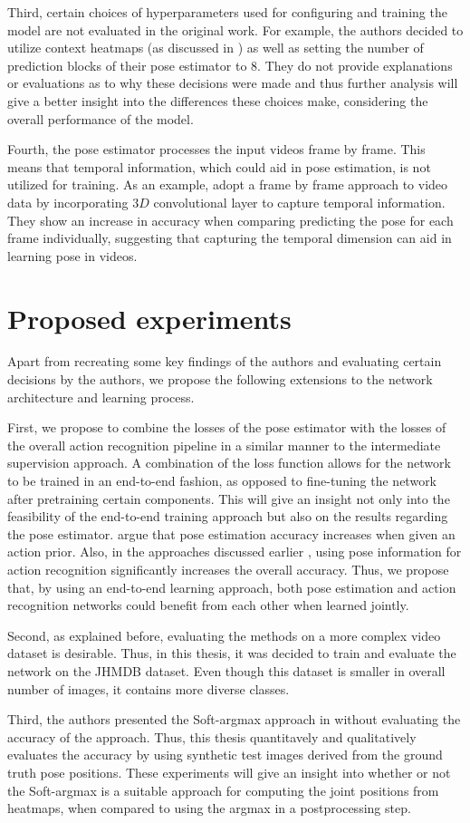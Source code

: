 Third, certain choices of hyperparameters used for configuring and training the model  are not evaluated in the original work.
For example, the authors decided to utilize context heatmaps (as discussed in ) as well as setting the number of prediction blocks of their pose estimator to $8$.
They do not provide explanations or evaluations as to why these decisions were made and thus further analysis will give a better insight into the differences these choices make, considering the overall performance of the model.

Fourth, the pose estimator processes the input videos frame by frame.
This means that temporal information, which could aid in pose estimation, is not utilized for training.
As an example, \cite{girdhar_detect-and-track:_2018} adopt a frame by frame approach to video data by incorporating $3D$ convolutional layer to capture temporal information.
They show an increase in accuracy when comparing predicting the pose for each frame individually, suggesting that capturing the temporal dimension can aid in learning pose in videos.

\section{Proposed experiments}
Apart from recreating some key findings of the authors and evaluating certain decisions by the authors, we propose the following extensions to the network architecture and learning process.

First, we propose to combine the losses of the pose estimator with the losses of the overall action recognition pipeline in a similar manner to the intermediate supervision approach.
A combination of the loss function allows for the network to be trained in an end-to-end fashion, as opposed to fine-tuning the network after pretraining certain components.
This will give an insight not only into the feasibility of the end-to-end training approach but also on the results regarding the pose estimator.
\cite{iqbal_pose_2016} argue that pose estimation accuracy increases when given an action prior.
Also, in the approaches discussed earlier , using pose information for action recognition significantly increases the overall accuracy.
Thus, we propose that, by using an end-to-end learning approach, both pose estimation and action recognition networks could benefit from each other when learned jointly.

Second, as explained before, evaluating the methods on a more complex video dataset is desirable.
Thus, in this thesis, it was decided to train and evaluate the network on the JHMDB dataset.
Even though this dataset is smaller in overall number of images, it contains more diverse classes.

Third, the authors presented the Soft-argmax approach in \cite{luvizon_human_2017} without evaluating the accuracy of the approach.
Thus, this thesis quantitavely and qualitatively evaluates the accuracy by using synthetic test images derived from the ground truth pose positions.
These experiments will give an insight into whether or not the Soft-argmax is a suitable approach for computing the joint positions from heatmaps, when compared to using the argmax in a postprocessing step.
